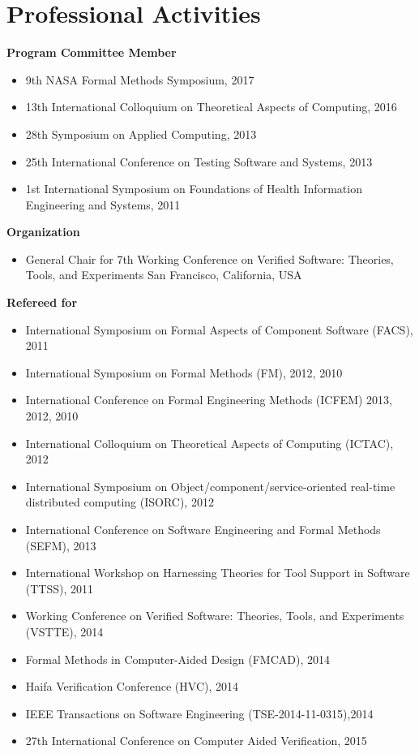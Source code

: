 \bigskip
\section{\sc Professional Activities}

\textbf{Program Committee Member}
\begin{itemize}
  \item 9th NASA Formal Methods Symposium, 2017 
  \item 13th International Colloquium on Theoretical Aspects of Computing, 2016
  \item 28th Symposium on Applied Computing, 2013
  \item 25th International Conference on Testing Software and Systems, 2013 
  \item 1st International Symposium on Foundations of Health Information Engineering and Systems, 2011   
\end{itemize}

\textbf{Organization}
\begin{itemize}
  \item General Chair for 7th Working Conference on Verified Software: Theories, Tools, and Experiments
San Francisco, California, USA
\end{itemize}

\textbf{Refereed for}
\begin{itemize}
  \item International Symposium on Formal Aspects of Component Software (FACS), 2011  
  \item International Symposium on Formal Methods (FM), 2012, 2010
  \item International Conference on Formal Engineering Methods (ICFEM) 2013, 2012, 2010
  \item International Colloquium on Theoretical Aspects of Computing (ICTAC), 2012
  \item International Symposium on Object/component/service-oriented real-time distributed computing (ISORC), 2012  
  \item International Conference on Software Engineering and Formal Methods (SEFM), 2013
  \item International Workshop on Harnessing Theories for Tool Support in Software (TTSS), 2011  
  \item Working Conference on Verified Software: Theories, Tools, and
  Experiments (VSTTE), 2014
  \item Formal Methods in Computer-Aided Design (FMCAD), 2014
  \item Haifa Verification Conference (HVC), 2014
  \item IEEE Transactions on Software Engineering (TSE-2014-11-0315),2014
  \item 27th International Conference on Computer Aided Verification, 2015
\end{itemize}

\bigskip